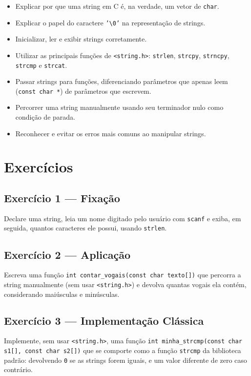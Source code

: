 \documentclass[12pt,a4paper,oneside]{extreport}
\begin{document}
\begin{tcolorbox}[title={Ao final deste capítulo, você deve ser capaz de:}]
\begin{itemize}
    \item Explicar por que uma string em C é, na verdade, um vetor de \texttt{char}.
    \item Explicar o papel do caractere \texttt{'\textbackslash 0'} na representação de strings.
    \item Inicializar, ler e exibir strings corretamente.
    \item Utilizar as principais funções de \texttt{<string.h>}: \texttt{strlen}, \texttt{strcpy}, \texttt{strncpy}, \texttt{strcmp} e \texttt{strcat}.
    \item Passar strings para funções, diferenciando parâmetros que apenas leem (\texttt{const char *}) de parâmetros que escrevem.
    \item Percorrer uma string manualmente usando seu terminador nulo como condição de parada.
    \item Reconhecer e evitar os erros mais comuns ao manipular strings.
\end{itemize}
\end{tcolorbox}

\section*{Exercícios}

\subsection*{Exercício 1 --- Fixação}
Declare uma string, leia um nome digitado pelo usuário com \texttt{scanf} e exiba, em seguida, quantos caracteres ele possui, usando \texttt{strlen}.

\subsection*{Exercício 2 --- Aplicação}
Escreva uma função \texttt{int contar\_vogais(const char texto[])} que percorra a string manualmente (sem usar \texttt{<string.h>}) e devolva quantas vogais ela contém, considerando maiúsculas e minúsculas.

\subsection*{Exercício 3 --- Implementação Clássica}
Implemente, sem usar \texttt{<string.h>}, uma função \texttt{int minha\_strcmp(const char s1[], const char s2[])} que se comporte como a função \texttt{strcmp} da biblioteca padrão: devolvendo \texttt{0} se as strings forem iguais, e um valor diferente de zero caso contrário.
\end{document}
